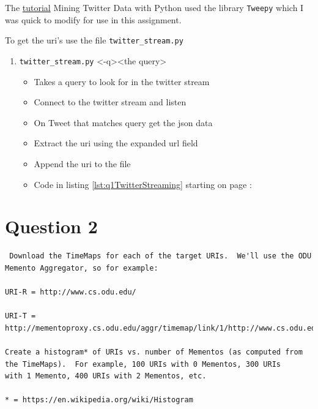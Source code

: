 \documentclass[letterpaper,10pt]{article}
\begin{document}
The \href{http://marcobonzanini.com/2015/03/02/mining-twitter-data-with-python-part-1/}{tutorial} Mining Twitter Data with Python used the library \verb+Tweepy+ which I was quick to modify for use in this assignment.

To get the uri's use the file \verb+twitter_stream.py+
\begin{enumerate}
\item \verb+twitter_stream.py+ \textless -q\textgreater \textless the query\textgreater 
	\begin{itemize}
	\item Takes a query to look for in the twitter stream
	\item Connect to the twitter stream and listen
	\item On Tweet that matches query get the json data
	\item Extract the uri using the expanded url field
	\item Append the uri to the file
	\item Code in listing \ref{lst:q1TwitterStreaming} starting on page \pageref{lst:q1TwitterStreaming}:
	\end{itemize}
\end{enumerate}
\newpage 

 \newpage  
\section*{Question 2}
\begin{verbatim}
 Download the TimeMaps for each of the target URIs.  We'll use the ODU 
Memento Aggregator, so for example:

URI-R = http://www.cs.odu.edu/

URI-T = http://mementoproxy.cs.odu.edu/aggr/timemap/link/1/http://www.cs.odu.edu/

Create a histogram* of URIs vs. number of Mementos (as computed from
the TimeMaps).  For example, 100 URIs with 0 Mementos, 300 URIs
with 1 Memento, 400 URIs with 2 Mementos, etc.

* = https://en.wikipedia.org/wiki/Histogram 
\end{verbatim}
\end{document}
